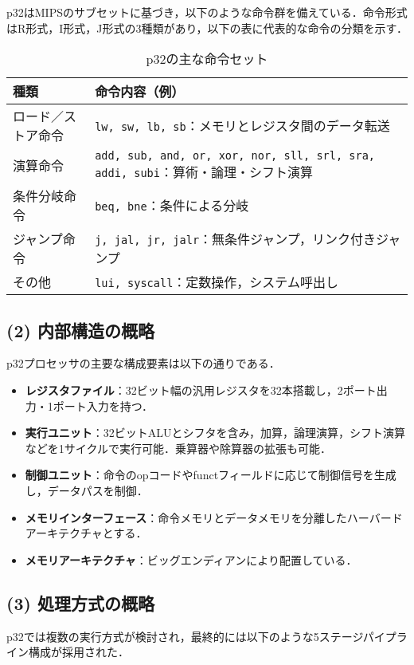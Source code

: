 \documentclass[autodetect-engine,dvi=dvipdfmx,ja=standard,
               a4j,11pt]{bxjsarticle}
\begin{document}
p32はMIPSのサブセットに基づき，以下のような命令群を備えている．命令形式はR形式，I形式，J形式の3種類があり，以下の表に代表的な命令の分類を示す．
\begin{table}[hbtp]
\centering
\caption{p32の主な命令セット}
\begin{tabularx}{\linewidth}{|l|X|}
\hline
種類 & 命令内容（例） \\
\hline
ロード／ストア命令 & \texttt{lw, sw, lb, sb}：メモリとレジスタ間のデータ転送 \\
\hline
演算命令 & \texttt{add, sub, and, or, xor, nor, sll, srl, sra, addi, subi}：算術・論理・シフト演算 \\
\hline
条件分岐命令 & \texttt{beq, bne}：条件による分岐 \\
\hline
ジャンプ命令 & \texttt{j, jal, jr, jalr}：無条件ジャンプ，リンク付きジャンプ \\
\hline
その他 & \texttt{lui, syscall}：定数操作，システム呼出し \\
\hline
\end{tabularx}
\end{table}

\subsection*{(2) 内部構造の概略}

p32プロセッサの主要な構成要素は以下の通りである．

\begin{itemize}
\item \textbf{レジスタファイル}：32ビット幅の汎用レジスタを32本搭載し，2ポート出力・1ポート入力を持つ．
\item \textbf{実行ユニット}：32ビットALUとシフタを含み，加算，論理演算，シフト演算などを1サイクルで実行可能．乗算器や除算器の拡張も可能．
\item \textbf{制御ユニット}：命令のopコードやfunctフィールドに応じて制御信号を生成し，データパスを制御．
\item \textbf{メモリインターフェース}：命令メモリとデータメモリを分離したハーバードアーキテクチャとする．
\item \textbf{メモリアーキテクチャ}：ビッグエンディアンにより配置している．
\end{itemize}
\subsection*{(3) 処理方式の概略}

p32では複数の実行方式が検討され，最終的には以下のような5ステージパイプライン構成が採用された．
\end{document}
